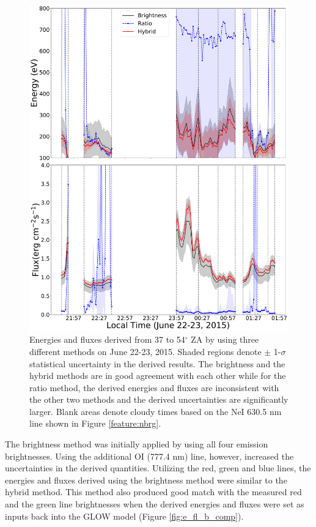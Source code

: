 \documentclass[crop=false,class=mitthesis,oneside,font=12pt]{standalone}
\begin{document}
\begin{figure}[H]
	\centering\includegraphics[width=30pc]{different_method_e_fl.pdf}
	\caption{Energies and fluxes derived from 37 to 54$^\circ$ ZA by using three different methods on June 22-23, 2015. Shaded regions denote $\pm$ 1-$\sigma$ statistical uncertainty in the derived results. The brightness and the hybrid methods are in good agreement with each other while for the ratio method, the derived energies and fluxes are inconsistent with the other two methods and the derived uncertainties are significantly larger. Blank areas denote cloudy times based on the NeI 630.5 nm line shown in Figure \ref{feature:nbrg}.}
	\label{fig:e_fl_3mtd}
\end{figure}

The brightness method was initially applied by using all four emission brightnesses. Using the additional OI (777.4 nm) line, however, increased the uncertainties in the derived quantities. Utilizing the red, green and blue lines, the energies and fluxes derived using the brightness method were similar to the hybrid method. This method also produced good match with the measured red and the green line brightnesses when the derived energies and fluxes were set as inputs back into the GLOW model (Figure \ref{fig:e_fl_b_comp}). 
\end{document}
